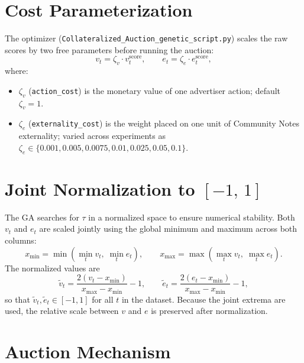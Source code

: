 \documentclass[11pt]{article}
\begin{document}
\section{Cost Parameterization}

The optimizer (\texttt{Collateralized\_Auction\_genetic\_script.py}) scales the raw scores
by two free parameters before running the auction:
\begin{equation}
    v_t = \zeta_v \cdot v_t^{\text{score}}, \qquad
    e_t = \zeta_e \cdot e_t^{\text{score}},
    \label{eq:scaling}
\end{equation}
where:
\begin{itemize}
    \item $\zeta_v$ (\texttt{action\_cost}) is the monetary value of one advertiser action;
          default $\zeta_v = 1$.
    \item $\zeta_e$ (\texttt{externality\_cost}) is the weight placed on one unit of
          Community Notes externality; varied across experiments as
          $\zeta_e \in \{0.001, 0.005, 0.0075, 0.01, 0.025, 0.05, 0.1\}$.
\end{itemize}

\section{Joint Normalization to $[-1,\,1]$}

The GA searches for $\tau$ in a normalized space to ensure numerical stability.
Both $v_t$ and $e_t$ are scaled jointly using the global minimum and maximum
across both columns:
\begin{equation}
    x_{\min} = \min\!\left(\min_t v_t,\; \min_t e_t\right), \qquad
    x_{\max} = \max\!\left(\max_t v_t,\; \max_t e_t\right).
\end{equation}
The normalized values are
\begin{equation}
    \tilde{v}_t = \frac{2(v_t - x_{\min})}{x_{\max} - x_{\min}} - 1, \qquad
    \tilde{e}_t = \frac{2(e_t - x_{\min})}{x_{\max} - x_{\min}} - 1,
    \label{eq:normalization}
\end{equation}
so that $\tilde{v}_t, \tilde{e}_t \in [-1,1]$ for all $t$ in the dataset.
Because the joint extrema are used, the relative scale between $v$ and $e$ is
preserved after normalization.

\section{Auction Mechanism}
\end{document}

